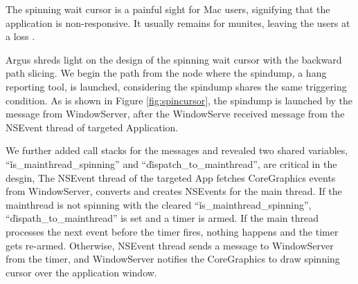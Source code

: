 The spinning wait cursor is a painful sight for Mac users, signifying that the application is non-responsive.
It usually remains for munites, leaving the users at a loss .                    

Argus shreds light on the design of the spinning wait cursor with the backward path slicing.
We begin the path from the node where the spindump, a hang reporting tool, is launched,  
considering the spindump shares the same triggering condition.
As is shown in Figure \ref{fig:spincursor}, the spindump is launched by the message from WindowServer, after the WindowServe received message from the NSEvent thread of targeted Application.

We further added call stacks for the messages and revealed two shared variables, ``\v{is\_mainthread\_spinning}'' and ``\v{dispatch\_to\_mainthread}'', are critical in the desgin,
The NSEvent thread of the targeted App fetches CoreGraphics events from WindowServer, converts and creates NSEvents for the main thread.
If the mainthread is not spinning with the cleared ``\v{is\_mainthread\_spinning}'', ``\v{dispath\_to\_mainthread}'' is set and a timer is armed.
If the main thread processes the next event before the timer fires, nothing happens and the timer gets re-armed.
Otherwise, NSEvent thread sends a message to WindowServer from the timer,
and WindowServer notifies the CoreGraphics to draw spinning cursor over the application window.
